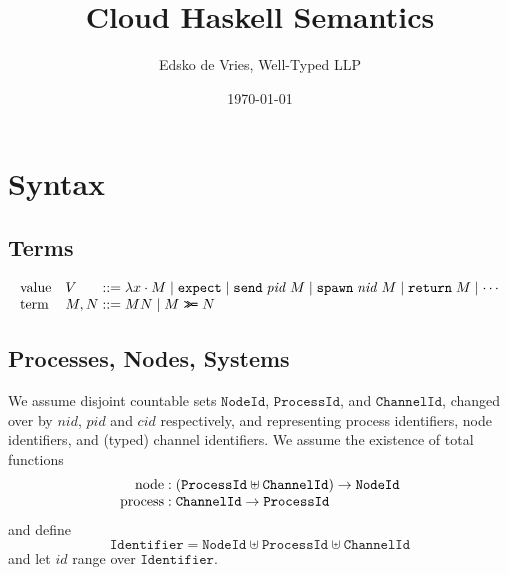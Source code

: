 \documentclass{article}
\newcommand{\sLam}[2]{\lambda {#1} \cdot {#2}}
\newcommand{\sApp}[2]{{#1} {#2}}
\newcommand{\sBind}[2]{{#1} \mathrel{\texttt{>}\!\!\texttt{>}\!\texttt{=}} {#2}}
\newcommand{\sReturn}{\mathtt{return}}
\newcommand{\sExpect}{\mathtt{expect}}
\newcommand{\sSend}{\mathtt{send}}
\newcommand{\sSpawn}{\mathtt{spawn}}
\DeclareMathOperator{\sNodeOf}{node}
\DeclareMathOperator{\sProcessOf}{process}
\newcommand{\sNid}{\ensuremath{\mathit{nid}}}
\newcommand{\sPid}{\ensuremath{\mathit{pid}}}
\newcommand{\sCid}{\ensuremath{\mathit{cid}}}
\newcommand{\sId}{\ensuremath{\mathit{id}}}
\newcommand{\OR}{\mathrel{|}}
\begin{document}
\title{Cloud Haskell Semantics}
\author{Edsko de Vries, Well-Typed LLP}
\date{\today}

\maketitle

\section{Syntax}

\subsection{Terms}

\begin{equation*}
\begin{array}{ll@{\;::=\;}l}
\text{value} & V    & \sLam{x}{M} \OR
                      \sExpect \OR
                      \sSend \; \sPid \; M \OR
                      \sSpawn \; \sNid \; M \OR 
                      \sReturn \; M \OR
                      \cdots
\\
\text{term}  & M, N & \sApp{M}{N} \OR
                      \sBind{M}{N}
\end{array}
\end{equation*}

\subsection{Processes, Nodes, Systems}

We assume disjoint countable sets $\mathtt{NodeId}$, $\mathtt{ProcessId}$, and
$\mathtt{ChannelId}$, changed over by \sNid, \sPid{} and \sCid{} respectively,
and representing process identifiers, node identifiers, and (typed) channel
identifiers. We assume the existence of total functions
%
\begin{equation*}
\begin{array}{r@{\;:\;}l}
\sNodeOf    & (\mathtt{ProcessId} \uplus \mathtt{ChannelId}) \rightarrow \mathtt{NodeId} \\
\sProcessOf & \mathtt{ChannelId} \rightarrow \mathtt{ProcessId} 
\end{array}
\end{equation*}
%
and define 
$$\mathtt{Identifier} = \mathtt{NodeId} \uplus \mathtt{ProcessId} \uplus \mathtt{ChannelId}$$ 
and let $\sId$ range over $\mathtt{Identifier}$.
\end{document}
